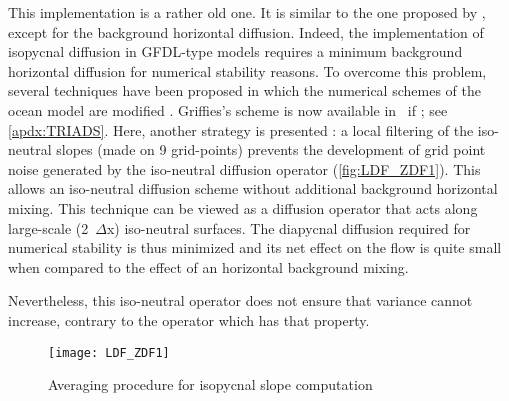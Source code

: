 \documentclass[../main/NEMO_manual]{subfiles}
\begin{document}
This implementation is a rather old one.
It is similar to the one proposed by \citet{cox_OM87}, except for the background horizontal diffusion.
Indeed, the \citet{cox_OM87} implementation of isopycnal diffusion in GFDL-type models requires
a minimum background horizontal diffusion for numerical stability reasons.
To overcome this problem, several techniques have been proposed in which the numerical schemes of
the ocean model are modified \citep{weaver.eby_JPO97, griffies.gnanadesikan.ea_JPO98}.
Griffies's scheme is now available in \NEMO\ if ; see \autoref{apdx:TRIADS}.
Here, another strategy is presented \citep{lazar_phd97}:
a local filtering of the iso-neutral slopes (made on 9 grid-points) prevents the development of
grid point noise generated by the iso-neutral diffusion operator (\autoref{fig:LDF_ZDF1}).
This allows an iso-neutral diffusion scheme without additional background horizontal mixing.
This technique can be viewed as a diffusion operator that acts along large-scale
(2~$\Delta$x)  iso-neutral surfaces.
The diapycnal diffusion required for numerical stability is thus minimized and its net effect on the flow is quite small when compared to the effect of an horizontal background mixing.

Nevertheless, this iso-neutral operator does not ensure that variance cannot increase,
contrary to the \citet{griffies.gnanadesikan.ea_JPO98} operator which has that property.

\begin{figure}[!ht]
  \centering
  \texttt{[image: LDF\_ZDF1]}
  \caption{Averaging procedure for isopycnal slope computation}
  \label{fig:LDF_ZDF1}
\end{figure}



\end{document}
